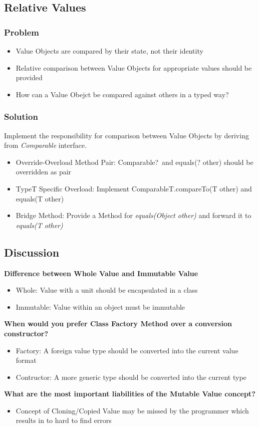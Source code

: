 \subsection{Relative Values}
\subsubsection{Problem}
\begin{itemize}[topsep=0pt]
    \itemsep -0.4em
    \item Value Objects are compared by their state, not their identity
    \item Relative comparison between Value Objects for appropriate values should be provided
    \item How can a Value Obejct be compared against others in a typed way?
\end{itemize}
\subsubsection{Solution}
Implement the responsibility for comparison between Value Objects by deriving from \textit{Comparable} interface.
\begin{itemize}[topsep=0pt]
    \itemsep -0.4em
    \item Override-Overload Method Pair: Comparable\<?\ and equals(? other) should be overridden as pair
    \item Type\<T\> Specific Overload: Implement Comparable\<T\>.compareTo(T other) and equals(T other)
    \item Bridge Method: Provide a Method for \textit{equals(Object other)} and forward it to \textit{equals(T other)}
\end{itemize}

\subsection{Discussion}
\textbf{Difference between Whole Value and Immutable Value}
\begin{itemize}[topsep=0pt]
    \itemsep -0.4em
    \item Whole: Value with a unit should be encapsulated in a class
    \item Immutable: Value within an object must be immutable
\end{itemize}
\textbf{When would you prefer Class Factory Method over a conversion constructor?}
\begin{itemize}[topsep=0pt]
    \itemsep -0.4em
    \item Factory: A foreign value type should be converted into the current value format
    \item Contructor: A more generic type should be converted into the current type
\end{itemize}
\textbf{What are the most important liabilities of the Mutable Value concept?}
\begin{itemize}[topsep=0pt]
    \itemsep -0.4em
    \item Concept of Cloning/Copied Value may be missed by the programmer which results in to hard to find errors
\end{itemize}